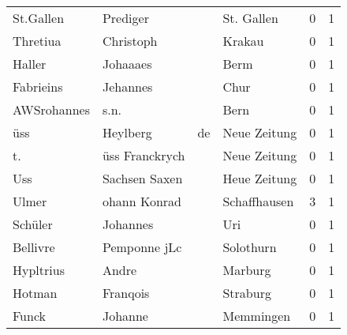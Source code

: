 \documentclass[10pt,a4paper,landscape]{article}
\begin{document}
\begin{longtable}{llllrr}
                St.Gallen &                           Prediger &             &                                  St. Gallen &          0 &         1 \\
                 Thretiua &                          Christoph &             &                                      Krakau &          0 &         1 \\
                   Haller &                           Johaaaes &             &                                        Berm &          0 &         1 \\
                Fabrieins &                           Jehannes &             &                                        Chur &          0 &         1 \\
              AWSrohannes &                               s.n. &             &                                        Bern &          0 &         1 \\
                      üss &                           Heylberg &          de &                                Neue Zeitung &          0 &         1 \\
                       t. &                     üss Franckrych &             &                                Neue Zeitung &          0 &         1 \\
                      Uss &                      Sachsen Saxen &             &                                Heue Zeitung &          0 &         1 \\
                    Ulmer &                       ohann Konrad &             &                                Schaffhausen &          3 &         1 \\
                  Schüler &                           Johannes &             &                                         Uri &          0 &         1 \\
                 Bellivre &                       Pemponne jLc &             &                                   Solothurn &          0 &         1 \\
                Hypltrius &                              Andre &             &                                     Marburg &          0 &         1 \\
                   Hotman &                           Franqois &             &                                    Straburg &          0 &         1 \\
                    Funck &                            Johanne &             &                                   Memmingen &          0 &         1 \\

\end{longtable}
\end{document}
